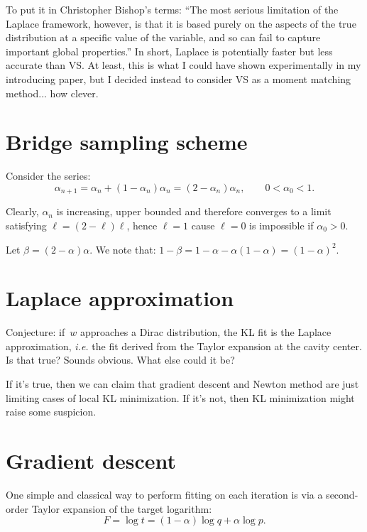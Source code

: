 \documentclass{article}
\begin{document}
To put it in Christopher Bishop's terms: ``The most serious limitation of the Laplace framework, however, is that it is based purely on the aspects of the true distribution at a specific value of the variable, and so can fail to capture important global properties.'' In short, Laplace is potentially faster but less accurate than VS. At least, this is what I could have shown experimentally in my introducing paper, but I decided instead to consider VS as a moment matching method... how clever.



\section{Bridge sampling scheme}

Consider the series:
$$
\alpha_{n+1}=\alpha_n+(1-\alpha_n)\alpha_n=(2-\alpha_n)\alpha_n,
\qquad
0 < \alpha_0 < 1 .
$$

Clearly, $\alpha_n$ is increasing, upper bounded and therefore converges to a limit satisfying $\ell=(2-\ell)\ell$, hence $\ell=1$ cause $\ell=0$ is impossible if $\alpha_0>0$. 

Let $\beta=(2-\alpha)\alpha$. We note that: $1-\beta=1-\alpha - \alpha(1-\alpha)=(1-\alpha)^2$.


\section{Laplace approximation}

Conjecture: if~$w$ approaches a Dirac distribution, the KL fit is the Laplace approximation, {\em i.e.} the fit derived from the Taylor expansion at the cavity center. Is that true? Sounds obvious. What else could it be? 

If it's true, then we can claim that gradient descent and Newton method are just limiting cases of local KL minimization. If it's not, then KL minimization might raise some suspicion. 


\section{Gradient descent}

One simple and classical way to perform fitting on each iteration is via a second-order Taylor expansion of the target logarithm:
$$
F = \log t = (1-\alpha)\log q + \alpha \log p.
$$
\end{document}
